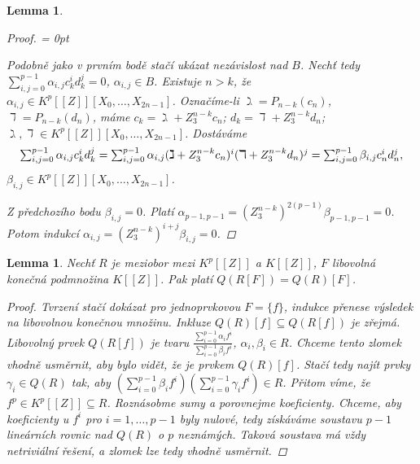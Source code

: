 \documentclass[11pt,a4paper]{article}
\newcommand*{\ml}[1]{\[\textstyle\let\displaystyle\textstyle#1\]}	%
\newenvironment{items}{%
	\itemize
	\itemsep = 0pt%
}{%
	\enditemize
}
\newcounter{numb}
\theoremstyle{definition}
\theoremstyle{plain}
\newtheorem{lemma}[numb]{Lemma}
\begin{document}
\begin{lemma}
\begin{proof}
\begin{items}
			\newcommand*{\J}{_{i, j = 0}^{p - 1}}
			\item Podobně jako v prvním bodě stačí ukázat nezávislost nad $B$. Nechť tedy $\sum\J \alpha_{i, j} c_k^i d_k^j = 0$, $\alpha_{i, j} \in B$. Existuje $n > k$, že $\alpha_{i, j} \in K^p[[Z]][X_0, \hdots, X_{2n - 1}]$. Označíme-li $\gimel = P_{n - k}(c_n)$, $\daleth = P_{n - k}(d_n)$, máme $c_k = \gimel + Z_3^{n - k} c_n$; $d_k = \daleth + Z_3^{n - k} d_n$; $\gimel, \daleth \in K^p[[Z]][X_0, \hdots, X_{2n - 1}]$. Dostáváme
			\ml{
				\sum\J \alpha_{i, j} c_k^i d_k^j = \sum\J \alpha_{i, j} (\gimel + Z_3^{n - k} c_n)^i (\daleth + Z_3^{n - k} d_n)^j = \sum\J \beta_{i, j} c_n^i d_n^j,
			}
			$\beta_{i, j} \in K^p[[Z]][X_0, \hdots, X_{2n - 1}]$.
			
			Z předchozího bodu $\beta_{i, j} = 0$. Platí $\alpha_{p - 1, p - 1} = (Z_3^{n - k})^{2(p - 1)} \beta_{p - 1, p - 1} = 0$. Potom indukcí $\alpha_{i, j} = (Z_3^{n - k})^{i + j} \beta_{i, j} = 0$.
			\qedhere
		\end{items}
	\end{proof}
\end{lemma}

\begin{lemma} \label{thm:QRf}
	Nechť $R$ je meziobor mezi $K^p[[Z]]$ a $K[[Z]]$, $F$ libovolná konečná podmnožina $K[[Z]]$. Pak platí $Q(R[F]) = Q(R)[F]$.
	
	\begin{proof}
		\newcommand*{\I}{_{i = 0}^{p - 1}}
		
		Tvrzení stačí dokázat pro jednoprvkovou $F = \{f\}$, indukce přenese výsledek na libovolnou konečnou množinu. Inkluze $Q(R)[f] \subseteq Q(R[f])$ je zřejmá. Libovolný prvek $Q(R[f])$ je tvaru $\frac{\sum\I \alpha_i f^i}{\sum\I \beta_i f^i}$, $\alpha_i, \beta_i \in R$. Chceme tento zlomek vhodně usměrnit, aby bylo vidět, že je prvkem $Q(R)[f]$. Stačí tedy najít prvky $\gamma_i \in Q(R)$ tak, aby $(\sum\I \beta_i f^i)(\sum\I \gamma_i f^i) \in R$. Přitom víme, že $f^p \in K^p[[Z]] \subseteq R$. Roznásobme sumy a porovnejme koeficienty. Chceme, aby koeficienty u $f^i$ pro $i = 1, \hdots, p - 1$ byly nulové, tedy získáváme soustavu $p - 1$ lineárních rovnic nad $Q(R)$ o $p$ neznámých. Taková soustava má vždy netriviální řešení, a zlomek lze tedy vhodně usměrnit.
	\end{proof}
\end{lemma}
\end{document}
